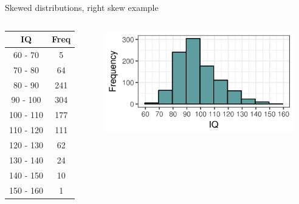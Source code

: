 \documentclass[xcolor=table, aspectratio=169, bigger, handout]{beamer}
\begin{document}
\begin{frame}{Skewed distributions, right skew example}

\begin{columns}
\begin{column}{0.35\textwidth}
\begin{exampleblock}{}
\begin{center}
\begin{tabular}{cc}
IQ & Freq \\
\hline
60 - 70 & 5 \\
70 - 80 & 64 \\
80 - 90 & 241 \\
90 - 100 & 304 \\
100 - 110 & 177 \\
110 - 120 & 111 \\
120 - 130 & 62 \\
130 - 140 & 24 \\
140 - 150 & 10 \\
150 - 160 & 1 \\
\end{tabular}
\end{center}
\end{exampleblock}
\end{column}
\pause
\begin{column}{0.65\textwidth}
\begin{center}
\includegraphics[width=3.25in]{../images/wk04_iq_right_hist}

\end{center}
\end{column}
\end{columns}

\end{frame}
\end{document}
